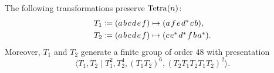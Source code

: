 \documentclass[notitlepage, 11pt, letterpaper]{amsart}
\begin{document}
\begin{prop}[Oriented]
    \label{prop:tet_symmetry}
    The following transformations preserve $\operatorname{Tetra}(n)$:
    \begin{align}
        \label{eq:gens_of_tet_sym}
        \begin{split}
            T_1 \coloneqq \tightoctuple{( & \ea & \eb & \ec & \ed  & \ee  & \ef & )}
            &\mapsto
            \tightoctuple{( & \ea & \ef  & \ee  & \ed^{*}  & \ec  & \eb & )}, \\
            T_2 \coloneqq \tightoctuple{( & \ea & \eb & \ec & \ed  & \ee  & \ef & )}
            &\mapsto
            \tightoctuple{( & \ec  & \ee^*  & \ed^{*}  & \ef  & \eb  & \ea^* & )}.
        \end{split}
    \end{align}
    Moreover, $T_1$ and $T_2$ generate a finite group of order $48$ with presentation
    \begin{equation}
        \langle T_1, T_2 \mid T_1^2, T_2^4, (T_1 T_2)^6, (T_2T_1T_2T_1T_2)^2 \rangle.
    \end{equation}

\end{prop}
\end{document}
